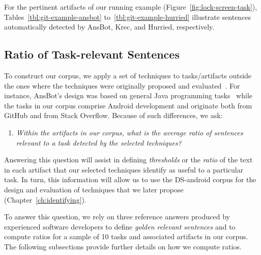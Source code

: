 For the pertinent artifacts of our running example (Figure~\ref{fig:lock-screen-task}), 
Tables~\ref{tbl:git-example-ansbot} to~\ref{tbl:git-example-hurried}
illustrate sentences automatically detected by \acs{AnsBot}, \acs{Krec}, and \acs{Hurried}, respectively.
 











\subsection{Ratio of Task-relevant Sentences}
\label{cp4:corpus-relevant-text-ratio}


To construct our corpus, we apply a set of techniques 
to tasks/artifacts outside the ones where the techniques were originally proposed and evaluated~\cite{nadi2020, Robillard2015, Lotufo2012, Xu2017}.
For instance, \acs{AnsBot}'s design was based on general Java programming tasks~\cite{Xu2017} while the tasks in our corpus comprise Android development and originate both from GitHub and from Stack Overflow. Because of such differences, we ask:


\begin{enumerate}[label={},leftmargin=0.7cm]
\item \textit{Within the artifacts in our corpus, what is the average ratio of sentences relevant to a task detected by the selected techniques?} 

\end{enumerate}



Answering this question will assist in defining \textit{thresholds} or the \textit{ratio}
of the text in each artifact that our selected techniques identify as useful to a particular task.
In turn, this information will allow us to use the \acs{DS-android} corpus for the design and evaluation of techniques that we later propose (Chapter~\ref{ch:identifying}).



To answer this question, we rely on three reference answers produced by 
experienced software developers to define \textit{golden relevant sentences} 
and to compute ratios for a sample of 10 tasks and associated artifacts in our corpus.
The following subsections provide further details on how we compute ratios.

